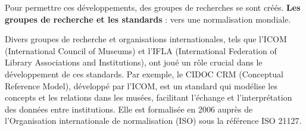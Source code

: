 Pour permettre ces développements, des groupes de recherches se sont créés. 
\textbf{Les groupes de recherche et les standards} : vers une normalisation mondiale. \newline

Divers groupes de recherche et organisations internationales, tels que l'ICOM (International Council of Museums) et l'IFLA (International Federation of Library Associations and Institutions), ont joué un rôle crucial dans le développement de ces standards. Par exemple, le CIDOC CRM (Conceptual Reference Model), développé par l'ICOM, est un standard qui modélise les concepts et les relations dans les musées, facilitant l’échange et l’interprétation des données entre institutions. Elle est formalisée en 2006 auprès de l'Organisation internationale de normalisation (ISO) sous la référence ISO 21127.

